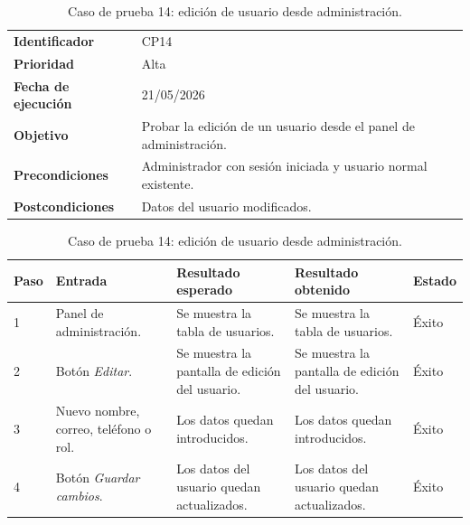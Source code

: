 \begin{table}[]
	\centering
	\footnotesize
	\renewcommand{\arraystretch}{1.2}
	\begin{tabularx}{\textwidth}{p{3.2cm} X}
		\toprule
		\textbf{Identificador} & CP14 \\
		\textbf{Prioridad} & Alta \\
		\textbf{Fecha de ejecución} & 21/05/2026 \\
		\textbf{Objetivo} & Probar la edición de un usuario desde el panel de administración. \\
		\textbf{Precondiciones} & Administrador con sesión iniciada y usuario normal existente. \\
		\textbf{Postcondiciones} & Datos del usuario modificados. \\
		\midrule
	\end{tabularx}
	\begin{tabularx}{\textwidth}{p{0.8cm} p{3.2cm} X X p{1.3cm}}
		\textbf{Paso} & \textbf{Entrada} & \textbf{Resultado esperado} & \textbf{Resultado obtenido} & \textbf{Estado} \\
		\midrule
		1 & Panel de administración. & Se muestra la tabla de usuarios. & Se muestra la tabla de usuarios. & Éxito \\
		2 & Botón \textit{Editar}. & Se muestra la pantalla de edición del usuario. & Se muestra la pantalla de edición del usuario. & Éxito \\
		3 & Nuevo nombre, correo, teléfono o rol. & Los datos quedan introducidos. & Los datos quedan introducidos. & Éxito \\
		4 & Botón \textit{Guardar cambios}. & Los datos del usuario quedan actualizados. & Los datos del usuario quedan actualizados. & Éxito \\
		\bottomrule
	\end{tabularx}
	\caption{Caso de prueba 14: edición de usuario desde administración.}
	\label{tab:cp14}
\end{table}


